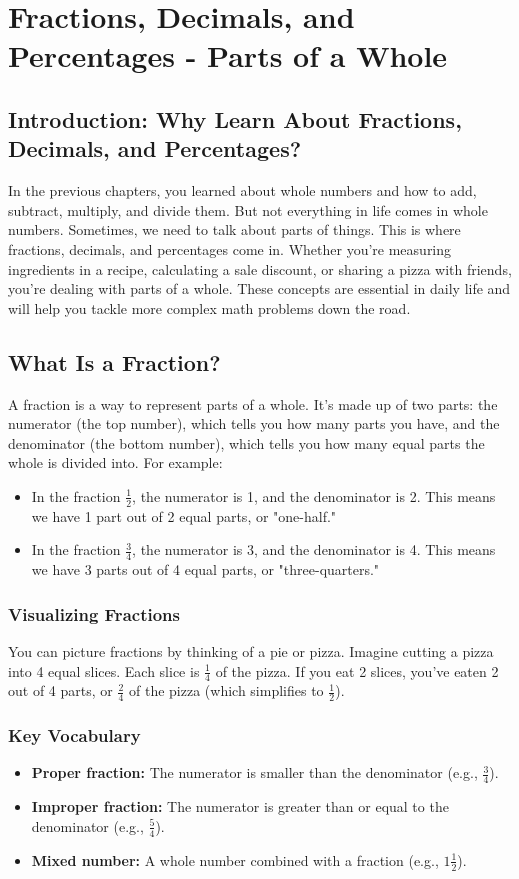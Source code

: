 \chapter{Fractions, Decimals, and Percentages - Parts of a Whole}

\section{Introduction: Why Learn About Fractions, Decimals, and Percentages?}
In the previous chapters, you learned about whole numbers and how to add, subtract, multiply, and divide them. But not everything in life comes in whole numbers. Sometimes, we need to talk about parts of things. This is where fractions, decimals, and percentages come in. Whether you’re measuring ingredients in a recipe, calculating a sale discount, or sharing a pizza with friends, you’re dealing with parts of a whole. These concepts are essential in daily life and will help you tackle more complex math problems down the road.

\section{What Is a Fraction?}
A fraction is a way to represent parts of a whole. It’s made up of two parts: the numerator (the top number), which tells you how many parts you have, and the denominator (the bottom number), which tells you how many equal parts the whole is divided into. For example:
\begin{itemize}
    \item In the fraction $\frac{1}{2}$, the numerator is 1, and the denominator is 2. This means we have 1 part out of 2 equal parts, or "one-half."
    \item In the fraction $\frac{3}{4}$, the numerator is 3, and the denominator is 4. This means we have 3 parts out of 4 equal parts, or "three-quarters."
\end{itemize}

\subsection{Visualizing Fractions}
You can picture fractions by thinking of a pie or pizza. Imagine cutting a pizza into 4 equal slices. Each slice is $\frac{1}{4}$ of the pizza. If you eat 2 slices, you’ve eaten 2 out of 4 parts, or $\frac{2}{4}$ of the pizza (which simplifies to $\frac{1}{2}$).

\subsection{Key Vocabulary}
\begin{itemize}
    \item \textbf{Proper fraction:} The numerator is smaller than the denominator (e.g., $\frac{3}{4}$).
    \item \textbf{Improper fraction:} The numerator is greater than or equal to the denominator (e.g., $\frac{5}{4}$).
    \item \textbf{Mixed number:} A whole number combined with a fraction (e.g., $1 \frac{1}{2}$).
\end{itemize}

